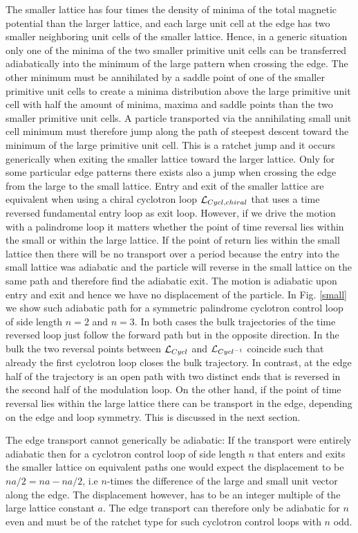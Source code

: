 \documentclass[12pt]{iopart}
\begin{document}
The smaller lattice has four times the density of minima of the total magnetic potential than the larger lattice,
and each large unit cell at the edge has two smaller neighboring unit cells of the smaller lattice. 
Hence, in a generic situation only one of the minima of the two smaller primitive unit cells can be transferred adiabatically into the
minimum of the large pattern when crossing the edge. The other minimum must be annihilated by a saddle point of one of the smaller
primitive unit cells to create a minima distribution above the large primitive unit cell with half the amount of minima, maxima and saddle
points than the two smaller primitive unit cells. A particle transported via the annihilating small unit cell minimum must
therefore jump along the path of steepest descent toward the minimum of the large primitive unit cell. This is a ratchet jump
and it occurs generically  when exiting the smaller lattice toward the larger lattice. Only for some particular edge patterns there exists also
a jump when crossing the edge from the large to the small lattice.
Entry and exit of the smaller lattice are equivalent when using a chiral cyclotron loop ${\cal L}_{Cycl,chiral}$ that uses a time reversed
fundamental entry loop as exit loop. 
However, if we drive the motion with a palindrome loop it matters whether the point of time reversal lies within the small or within the large lattice.
If the point of return lies within the small lattice then there will be no transport over a period because the entry into the small lattice was
adiabatic and the particle will reverse in the small lattice on the same path and therefore find the adiabatic exit.
The motion is adiabatic upon entry and exit and hence we have no displacement of the particle.
In Fig. \ref{small} we show such adiabatic path for a symmetric palindrome cyclotron control loop of side length $n=2$ and $n=3$.
In both cases the bulk trajectories of the time reversed loop just follow the forward path but in the opposite direction.
In the bulk the two reversal points between  ${\cal L}_{Cycl}$ and  ${\cal L}_{Cycl^{-1}}$ coincide such that already the first cyclotron loop closes the bulk trajectory.
In contrast, at the edge half of the trajectory is an open path with two distinct ends that is reversed in the second half of the modulation loop. On the other hand, if the point of time reversal lies within the large lattice there can be transport in the edge, depending on the edge and loop symmetry. This is discussed in the next section.

 The edge transport cannot generically be adiabatic: 
If the transport were entirely adiabatic then for a cyclotron control loop of side length $n$ that enters and exits the smaller lattice on equivalent paths one would expect the displacement to be $na/2=na-na/2$, i.e $n$-times the difference of the large and small unit vector along the edge. The displacement however, has to be an integer multiple of the large lattice constant $a$. The edge transport can therefore only be adiabatic for $n$ even and must be of the ratchet type for such cyclotron control loops with $n$ odd. 
\end{document}
